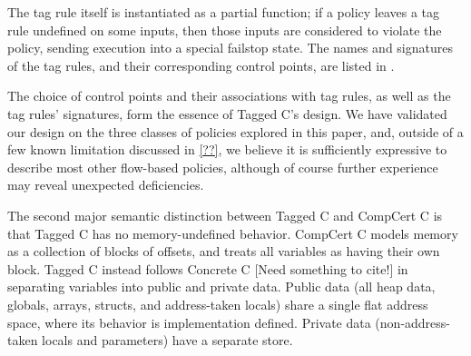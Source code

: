 \documentclass{llncs}
\begin{document}
\begin{minipage}[t]{0.37\textwidth}
  \binopsteptagless
\end{minipage}
\begin{minipage}[t]{0.6\textwidth}
  \binopstep
\end{minipage}

The tag rule itself is instantiated as a partial function; if a policy leaves a tag rule
undefined on some inputs, then those inputs are considered to violate the policy, sending
execution into a special failstop state. The names and signatures of the tag rules,
and their corresponding control points, are listed in .

The choice of control points and their associations with tag rules, as well as the tag rules'
signatures, form the essence of Tagged C's design. 
We have validated our design on the three classes of policies explored in this paper,
and, outside of a few known limitation discussed in \ref{??},
we believe it is sufficiently expressive to describe most other flow-based policies, although
of course further experience may reveal unexpected deficiencies. 

The second major semantic distinction between Tagged C and CompCert C is that Tagged C has no
memory-undefined behavior. CompCert C models memory as a collection of blocks of offsets,
and treats all variables as having their own block. Tagged C instead follows Concrete C
\cite{} [Need something to cite!] in separating variables into public and private data.
Public data (all heap data, globals, arrays, structs, and address-taken locals) share a single flat address
space, where its behavior is implementation defined. 
Private data (non-address-taken locals and parameters) have a separate store.

\end{document}
